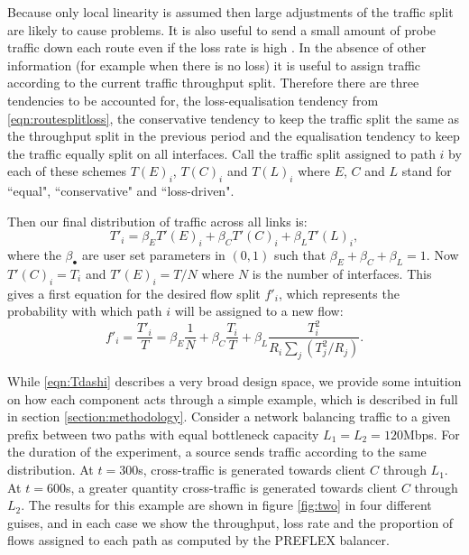 Because only local linearity is assumed then large adjustments of the traffic split are likely to cause problems.  
It is also useful to send a small amount of probe traffic down each route even if the loss rate is high \cite{Kelly:2005p140}. 
In the absence of other information (for example when there is no loss) it is useful to assign traffic according to the current traffic throughput split.  Therefore there are three tendencies to be accounted for, the loss-equalisation tendency from \eqref{eqn:routesplitloss}, the conservative tendency to keep the traffic split the same as the throughput split in the previous period and the equalisation tendency to keep the traffic equally split on all interfaces.  
Call the traffic split assigned to path $i$  by each of these schemes $T(E)_i$, $T(C)_i$ and $T(L)_i$ where $E$, $C$ and $L$ stand for ``equal", ``conservative" and ``loss-driven".

Then our final distribution of traffic across all links is:
$$
T'_i = \beta_E T'(E)_i + \beta_C T'(C)_i + \beta_L T'(L)_i,
$$
where the $\beta_\bullet$ are user set parameters in $(0,1)$ such that $\beta_E+\beta_C + \beta_L = 1$.  Now $T'(C)_i = T_i$ and $T'(E)_i = T/N$ where $N$ is the number of interfaces. 
This gives a first equation for the desired flow split $f'_i$, which represents the probability with which path $i$ will be assigned to a new flow:
\begin{equation}
f'_i = \frac{T'_i}{T} =  \beta_E \frac{1}{N} + \beta_C \frac{T_i}{T} +
\beta_L \frac{T_i^2}{R_i \sum_j (T_j^2/R_j)}.
\label{eqn:Tdashi}
\end{equation}


While \eqref{eqn:Tdashi} describes a very broad design space, we provide some intuition on how each component acts through a simple example, which is described in full in section \ref{section:methodology}. 
Consider a network balancing traffic to a given prefix between two paths with equal bottleneck capacity $L_1=L_2=120$Mbps.
For the duration of the experiment, a source sends traffic according to the same distribution.
At $t=300$s, cross-traffic is generated towards client $C$ through $L_1$.
At $t=600$s, a greater quantity cross-traffic is generated towards client $C$ through $L_2$.
The results for this example are shown in figure \ref{fig:two} in four different guises, and in each case we show the throughput, loss rate and the proportion of flows assigned to each path as computed by the \ac{PREFLEX} balancer.

